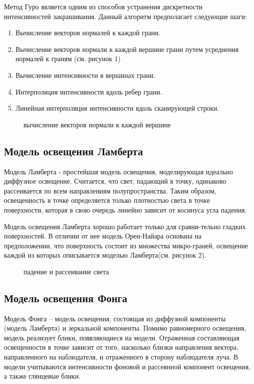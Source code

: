 Метод Гуро является одним из способов устранения дискретности интенсивностей закрашивания.
\newline\newline
Данный алгоритм предполагает следующие шаги:
\begin{enumerate}
	\item Вычисление векторов нормалей к каждой грани.
	\item Вычисление векторов нормали к каждой вершине грани путем усреднения нормалей к граням (см. рисунок 1)
	\item Вычисление интенсивности в вершинах грани.
	\item Интерполяция интенсивности вдоль ребер грани.
	\item Линейная интерполяция интенсивности вдоль сканирующей строки.
\end{enumerate}

\begin{figure}[h]
	\caption{вычисление векторов нормали к каждой вершине}
\end{figure}

\subsection*{Модель освещения Ламберта}
Модель Ламберта - простейшая модель освещения, моделирующая идеально диффузное освещение. Считается, что свет, падающий в точку, одинаково рассеивается по всем направлениям полупространства. Таким образом, освещенность в точке определяется только плотностью света в точке поверхности, которая в свою очередь линейно зависит от косинуса угла падения.

Модель освещения Ламберта хорошо работает только для сравни-тельно гладких поверхностей. В отличии от нее модель Орен-Найара основана на предположении, что поверхность состоит из множества микро-граней, освещение каждой из которых описывается моделью Ламберта(см. рисунок 2).

\begin{figure}[h]
	\caption{падение и рассеивание света}
\end{figure}

\subsection*{Модель освещения Фонга}
Модель Фонга – модель освещения, состоящая из диффузной компоненты (модель Ламберта) и зеркальной компоненты. Помимо равномерного освещения, модель реализует блики, появляющиеся на модели. Отраженная составляющая освещенности в точке зависит от того, насколько близки направления вектора, направленного на наблюдателя, и отраженного в сторону наблюдателя луча.  
В модели учитываются интенсивности фоновой и рассеянной компонент освещения, а также глянцевые блики.

